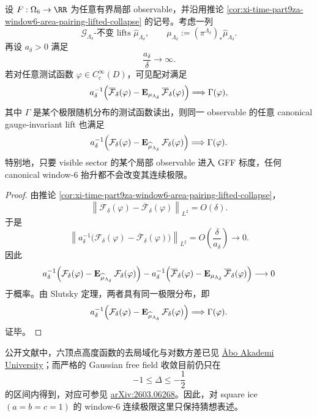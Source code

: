 \begin{theorem}\label{thm:xi-time-part9za-window6-gff-scaling-lift-invariance}
设 \(F:\Omega_6\to\RR\) 为任意有界局部 observable，并沿用推论
\ref{cor:xi-time-part9za-window6-area-pairing-lifted-collapse} 的记号。考虑一列
\[
\mathcal G_{\Lambda_\delta}\text{-不变 lifts }\widehat\mu_{\Lambda_\delta},
\qquad
\mu_{\Lambda_\delta}:=(\pi^{\Lambda_\delta})_*\widehat\mu_{\Lambda_\delta}.
\]
再设 \(a_\delta>0\) 满足
\[
\frac{a_\delta}{\delta}\longrightarrow \infty.
\]
若对任意测试函数 \(\varphi\in C_c^\infty(D)\)，可见配对满足
\[
a_\delta^{-1}
\Bigl(
\overline{\mathcal F}_\delta(\varphi)
-\mathbf E_{\mu_{\Lambda_\delta}}\,\overline{\mathcal F}_\delta(\varphi)
\Bigr)
\Longrightarrow
\Gamma(\varphi),
\]
其中 \(\Gamma\) 是某个极限随机分布的测试函数读出，则同一 observable 的任意 canonical gauge-invariant lift 也满足
\[
a_\delta^{-1}
\Bigl(
\mathcal F_\delta(\varphi)
-\mathbf E_{\widehat\mu_{\Lambda_\delta}}\,\mathcal F_\delta(\varphi)
\Bigr)
\Longrightarrow
\Gamma(\varphi).
\]
特别地，只要 visible sector 的某个局部 observable 进入 GFF 标度，任何 canonical window-\(6\) 抬升都不会改变其连续极限。
\end{theorem}
\begin{proof}
由推论 \ref{cor:xi-time-part9za-window6-area-pairing-lifted-collapse}，
\[
\left\|
\mathcal F_\delta(\varphi)-\overline{\mathcal F}_\delta(\varphi)
\right\|_{L^2}
=
O(\delta).
\]
于是
\[
\left\|
a_\delta^{-1}
\bigl(
\mathcal F_\delta(\varphi)-\overline{\mathcal F}_\delta(\varphi)
\bigr)
\right\|_{L^2}
=
O\!\left(\frac{\delta}{a_\delta}\right)
\longrightarrow 0.
\]
因此
\[
a_\delta^{-1}
\Bigl(
\mathcal F_\delta(\varphi)-\mathbf E_{\widehat\mu_{\Lambda_\delta}}\,\mathcal F_\delta(\varphi)
\Bigr)
-
a_\delta^{-1}
\Bigl(
\overline{\mathcal F}_\delta(\varphi)-\mathbf E_{\mu_{\Lambda_\delta}}\,\overline{\mathcal F}_\delta(\varphi)
\Bigr)
\longrightarrow 0
\]
于概率。由 Slutsky 定理，两者具有同一极限分布，即
\[
a_\delta^{-1}
\Bigl(
\mathcal F_\delta(\varphi)-\mathbf E_{\widehat\mu_{\Lambda_\delta}}\,\mathcal F_\delta(\varphi)
\Bigr)
\Longrightarrow
\Gamma(\varphi).
\]
证毕。
\end{proof}

\noindent
公开文献中，六顶点高度函数的去局域化与对数方差已见
\href{https://research.abo.fi/en/publications/delocalization-of-the-height-function-of-the-six-vertex-model/?utm_source=chatgpt.com}{Åbo Akademi University}；而严格的 Gaussian free field 收敛目前仍只在
\[
-1\le \Delta\le -\frac12
\]
的区间内得到，对应可参见
\href{https://arxiv.org/abs/2603.06268}{arXiv:2603.06268}。因此，对 square ice \((a=b=c=1)\) 的 window-\(6\) 连续极限这里只保持猜想表述。

